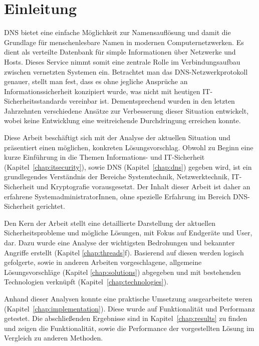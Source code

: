 \chapter{Einleitung}
\ac{DNS} bietet eine einfache Möglichkeit zur Namensauflösung und damit die Grundlage für menschenlesbare Namen in modernen Computernetzwerken. Es dient als verteilte Datenbank für simple Informationen über Netzwerke und Hosts. Dieses Service nimmt somit eine zentrale Rolle im Verbindungsaufbau zwischen vernetzten Systemen ein. Betrachtet man das DNS-Netzwerkprotokoll genauer, stellt man fest, dass es ohne jegliche Ansprüche an Informationssicherheit konzipiert wurde, was nicht mit heutigen IT-Sicherheitsstandards vereinbar ist. Dementsprechend wurden in den letzten Jahrzehnten verschiedene Ansätze zur Verbesserung dieser Situation entwickelt, wobei keine Entwicklung eine weitreichende Durchdringung erreichen konnte.

Diese Arbeit beschäftigt sich mit der Analyse der aktuellen Situation und präsentiert einen möglichen, konkreten Lösungsvorschlag. Obwohl zu Beginn eine kurze Einführung in die Themen Informations- und IT-Sicherheit (Kapitel~\ref{chap:itsecurity}), sowie DNS (Kapitel~\ref{chap:dns}) gegeben wird, ist ein grundlegendes Verständnis der Bereiche Systemtechnik, Netzwerktechnik, IT-Sicherheit und Kryptografie vorausgesetzt. Der Inhalt dieser Arbeit ist daher an erfahrene SystemadministratorInnen, ohne spezielle Erfahrung im Bereich DNS-Sicherheit gerichtet.

Den Kern der Arbeit stellt eine detaillierte Darstellung der aktuellen Sicherheitsprobleme und mögliche Lösungen, mit Fokus auf Endgeräte und User, dar. Dazu wurde eine Analyse der wichtigsten Bedrohungen und bekannter Angriffe erstellt (Kapitel \ref{chap:threads}f). Basierend auf diesen werden logisch gefolgerte, sowie in anderen Arbeiten vorgeschlagene, allgemeine Lösungsvorschläge (Kapitel \ref{chap:solutions}) abgegeben und mit bestehenden Technologien verknüpft (Kapitel~\ref{chap:technologies}).

Anhand dieser Analysen konnte eine praktische Umsetzung ausgearbeitete weren (Kapitel~\ref{chap:implementation}). Diese wurde auf Funktionalität und Performanz getestet. Die abschließenden Ergebnisse sind in Kapitel~\ref{chap:results} zu finden und zeigen die Funktionalität, sowie die Performance der vorgestellten Lösung im Vergleich zu anderen Methoden.    
